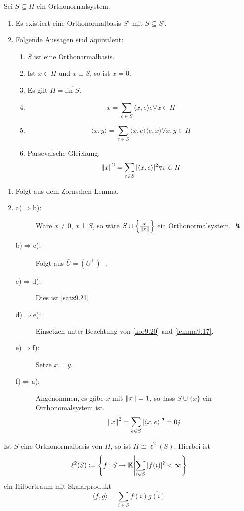 \begin{satz}
	Sei $ S\subseteq H $ ein Orthonormalsystem.
	\begin{enumerate}
		\item Es existiert eine Orthonormalbasis $ S' $ mit $ S\subseteq S' $.
		\item Folgende Aussagen sind \"aquivalent:
		\begin{enumerate}
			\item $ S $ ist eine Orthonormalbasis.
			\item Ist $ x\in H $ und $ x\perp S $, so ist $ x=0 $.
			\item Es gilt $ H=\overline{\text{lin }S} $.
			\item \[ x=\sum_{e\in S}\langle x,e\rangle e\forall x\in H \]
			\item \[ \langle x,y\rangle=\sum_{e\in S}\langle x,e\rangle\langle e,x\rangle\forall x,y\in H \]
			\item Parsevalsche Gleichung:
			\[ \left\|x\right\|^2=\sum_{e\in S}|\langle x,e\rangle|^2\forall x\in H \]
		\end{enumerate}
	\end{enumerate}
\end{satz}
\begin{beweis}
	\begin{enumerate}
		\item Folgt aus dem Zornschen Lemma.
		\item
		\begin{description}
			\item[a)$ \Rightarrow $b):] W\"are $ x\neq 0 $, $ x\perp S $, so w\"are $ S\cup\left\lbrace\frac{x}{\left\|x\right\|}\right\rbrace $ ein Orthonormalsystem. $ \lightning $
			\item[b)$ \Rightarrow $c):] Folgt aus $ \bar U=(U^\perp)^\perp $.
			\item[c)$ \Rightarrow $d):] Dies ist \ref{satz9.21}.
			\item[d)$ \Rightarrow $e):] Einsetzen unter Beachtung von \ref{kor9.20} und \ref{lemma9.17}.
			\item[e)$ \Rightarrow $f):] Setze $ x=y $.
			\item[f)$ \Rightarrow $a):] Angenommen, es g\"abe $ x $ mit $ \left\|x\right\|=1 $, so dass $ S\cup\lbrace x\rbrace $ ein Orthonomalsystem ist.
			\[ \left\|x\right\|^2=\sum_{e\in S} |\langle x,e\rangle|^2=0\lightning \]
		\end{description}
	\end{enumerate}
\end{beweis}
\begin{satz}
	Ist $ S $ eine Orthonormalbasis von $ H $,  so ist $ H\cong\ell^2(S) $. Hierbei ist
	\[ \ell^2(S)\coloneqq\left\lbrace f\colon S\rightarrow\mathbb{K}\middle|\sum_{i\in S} |f(i)|^2<\infty\right\rbrace \]
	ein Hilbertraum mit Skalarprodukt
	\[ \langle f,g\rangle=\sum_{i\in S} f(i)\overline{g(i)} \]
\end{satz}
